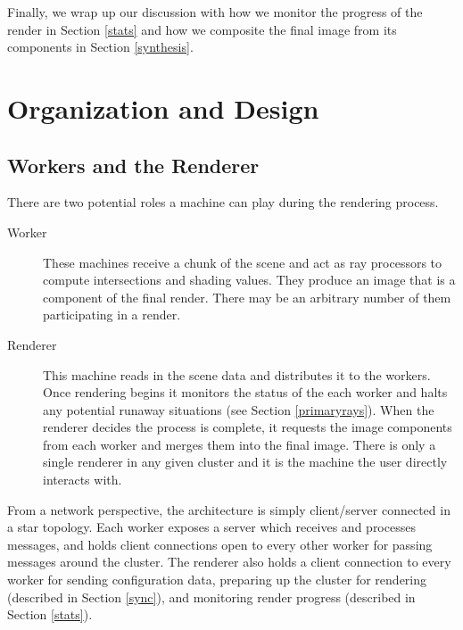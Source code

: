 \documentclass[12pt]{ucthesis}
\begin{document}
Finally, we wrap up our discussion with how we monitor the progress of the
render in Section \ref{stats} and how we composite the final image from its
components in Section \ref{synthesis}.

\section{Organization and Design}
\label{organization}

\subsection{Workers and the Renderer}
\label{workers}

There are two potential roles a machine can play during the rendering process.

\begin{description}
    \item[Worker] These machines receive a chunk of the scene and act as ray
        processors to compute intersections and shading values. They produce
        an image that is a component of the final render. There may be an
        arbitrary number of them participating in a render.
    \item[Renderer] This machine reads in the scene data and distributes it to
        the workers. Once rendering begins it monitors the status of the each
        worker and halts any potential runaway situations (see Section \ref{primaryrays}).
        When the renderer decides the process is complete, it requests
        the image components from each worker and merges them into the final
        image. There is only a single renderer in any given cluster and it is
        the machine the user directly interacts with.
\end{description}

From a network perspective, the architecture is simply client/server connected
in a star topology. Each worker exposes a server which receives and
processes messages, and holds client connections open to every other worker for
passing messages around the cluster. The renderer also holds a client connection
to every worker for sending configuration data, preparing up the cluster for rendering
(described in Section \ref{sync}), and monitoring render progress (described in
Section \ref{stats}).
\end{document}
